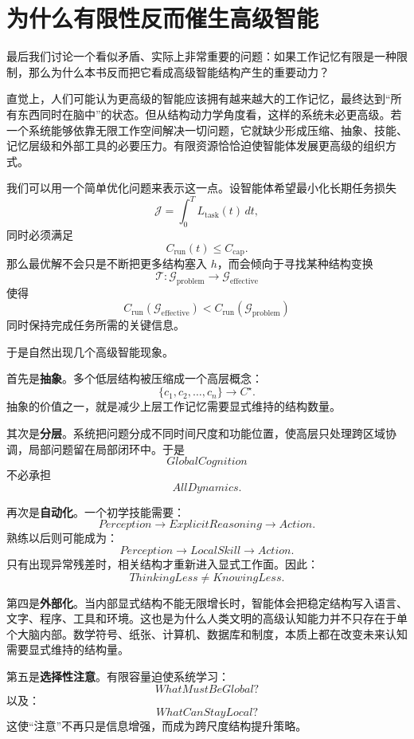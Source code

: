 \section{为什么有限性反而催生高级智能}
\label{sec:finiteness-drives-intelligence}

最后我们讨论一个看似矛盾、实际上非常重要的问题：如果工作记忆有限是一种限制，那么为什么本书反而把它看成高级智能结构产生的重要动力？

直觉上，人们可能认为更高级的智能应该拥有越来越大的工作记忆，最终达到“所有东西同时在脑中”的状态。但从结构动力学角度看，这样的系统未必更高级。若一个系统能够依靠无限工作空间解决一切问题，它就缺少形成压缩、抽象、技能、记忆层级和外部工具的必要压力。有限资源恰恰迫使智能体发展更高级的组织方式。

我们可以用一个简单优化问题来表示这一点。设智能体希望最小化长期任务损失
\[
\mathcal J
=
\int_0^T
L_{\mathrm{task}}(t)\,dt,
\]
同时必须满足
\[
C_{\mathrm{run}}(t)
\leq
C_{\mathrm{cap}}.
\]
那么最优解不会只是不断把更多结构塞入 $h$，而会倾向于寻找某种结构变换
\[
\mathcal T:
\mathcal G_{\mathrm{problem}}
\rightarrow
\mathcal G_{\mathrm{effective}}
\]
使得
\[
C_{\mathrm{run}}
\left(
\mathcal G_{\mathrm{effective}}
\right)
<
C_{\mathrm{run}}
\left(
\mathcal G_{\mathrm{problem}}
\right)
\]
同时保持完成任务所需的关键信息。

于是自然出现几个高级智能现象。

首先是\textbf{抽象}。多个低层结构被压缩成一个高层概念：
\[
\{c_1,c_2,\ldots,c_n\}
\rightarrow
C^\star.
\]
抽象的价值之一，就是减少上层工作记忆需要显式维持的结构数量。

其次是\textbf{分层}。系统把问题分成不同时间尺度和功能位置，使高层只处理跨区域协调，局部问题留在局部闭环中。于是
\[
GlobalCognition
\]
不必承担
\[
AllDynamics.
\]

再次是\textbf{自动化}。一个初学技能需要：
\[
Perception
\rightarrow
ExplicitReasoning
\rightarrow
Action.
\]
熟练以后则可能成为：
\[
Perception
\rightarrow
LocalSkill
\rightarrow
Action.
\]
只有出现异常残差时，相关结构才重新进入显式工作面。因此：
\[
\boxed{
ThinkingLess
\neq
KnowingLess.
}
\]

第四是\textbf{外部化}。当内部显式结构不能无限增长时，智能体会把稳定结构写入语言、文字、程序、工具和环境。这也是为什么人类文明的高级认知能力并不只存在于单个大脑内部。数学符号、纸张、计算机、数据库和制度，本质上都在改变未来认知需要显式维持的结构量。

第五是\textbf{选择性注意}。有限容量迫使系统学习：
\[
WhatMustBeGlobal?
\]
以及：
\[
WhatCanStayLocal?
\]
这使“注意”不再只是信息增强，而成为跨尺度结构提升策略。


